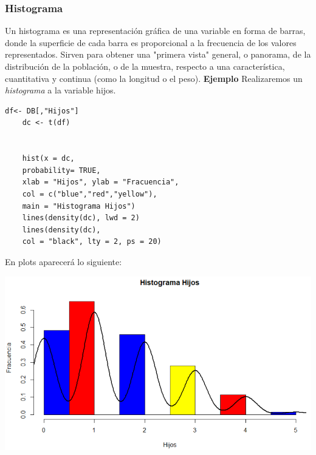 \documentclass[12pt,hidelinks]{article}
\begin{document}
	\subsubsection{Histograma}
	Un histograma es una representación gráfica de una variable en forma de barras, donde la superficie de cada barra es proporcional a la frecuencia de los valores representados. Sirven para obtener una "primera vista" general, o panorama, de la distribución de la población, o de la muestra, respecto a una característica, cuantitativa y continua (como la longitud o el peso). \textbf{Ejemplo} Realizaremos un \textit{histograma} a la variable hijos.
	\begin{lstlisting}[frame=single]
	df<- DB[,"Hijos"]
	dc <- t(df)
	
	
	hist(x = dc,
	probability= TRUE,
	xlab = "Hijos", ylab = "Fracuencia",
	col = c("blue","red","yellow"),
	main = "Histograma Hijos")
	lines(density(dc), lwd = 2)
	lines(density(dc),
	col = "black", lty = 2, ps = 20)
	\end{lstlisting}
	En plots aparecerá lo siguiente:
	\begin{center}
		\includegraphics[width = 14cm]{GraficaHisto.PNG}
	\end{center}
\end{document}
